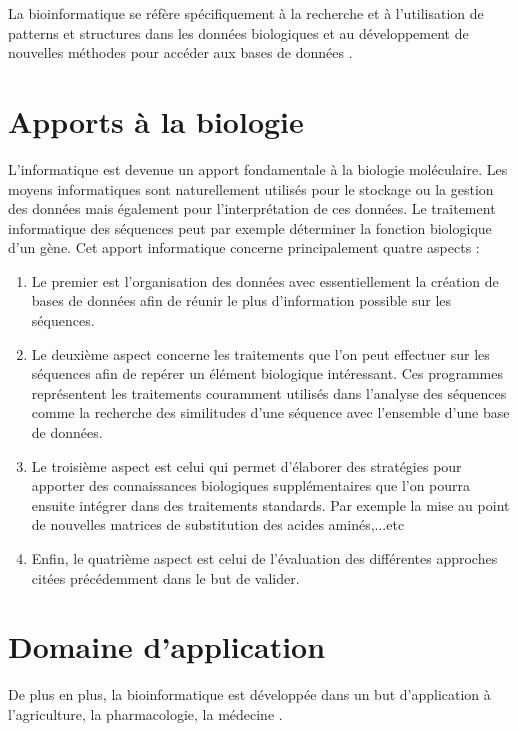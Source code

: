 \documentclass[12pt]{report}
\begin{document}
La bioinformatique  se réfère spécifiquement à la recherche et à l'utilisation de  patterns et structures dans les données biologiques et au développement de nouvelles méthodes pour accéder aux bases de données \cite{ref20} .
\section{Apports à la biologie}
L'informatique est devenue un apport fondamentale à la biologie moléculaire. Les moyens informatiques sont naturellement utilisés pour le stockage ou la gestion des données mais également pour l'interprétation de ces données. Le traitement informatique des séquences peut par exemple déterminer la fonction biologique d'un gène. Cet apport informatique concerne principalement quatre aspects :
\begin{enumerate}
\item Le premier est l'organisation des données avec essentiellement la création de bases de données afin de réunir le plus d'information possible sur les séquences. 
\item Le deuxième aspect concerne les traitements que l'on peut effectuer sur les séquences afin de repérer un élément biologique intéressant. Ces programmes représentent les traitements couramment utilisés dans l'analyse des séquences comme la recherche des similitudes d'une séquence avec l'ensemble d'une base de données.
\item Le troisième aspect est celui qui permet d'élaborer des stratégies pour apporter des connaissances biologiques supplémentaires que l'on pourra ensuite intégrer dans des traitements standards. Par exemple la mise au point de nouvelles matrices de substitution des acides aminés,...etc
\item  Enfin, le quatrième aspect est celui de l'évaluation des différentes approches citées précédemment dans le but de valider.

\end{enumerate}





\section{Domaine d'application}
De plus en plus, la bioinformatique est développée dans un but d'application à l'agriculture, la pharmacologie, la  médecine \cite{ref21}. 
\newpage
\end{document}
